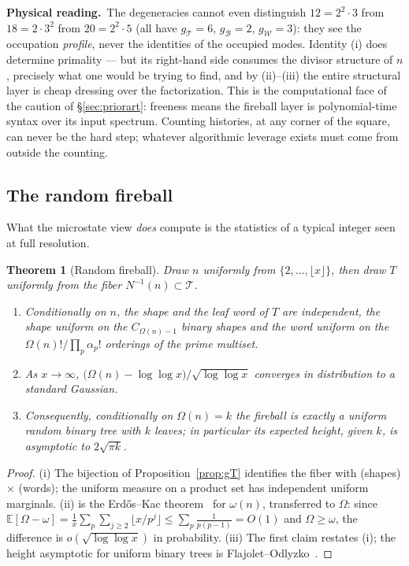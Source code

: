 \documentclass[11pt]{article}
\newcommand{\cT}{\mathcal{T}}   %
\newcommand{\cW}{\mathcal{W}}   %
\newcommand{\cB}{\mathcal{B}}   %
\newcommand{\physread}{\medskip\noindent\textbf{Physical reading.}\ }
\numberwithin{equation}{section}
\theoremstyle{plain}
\newtheorem{theorem}{Theorem}[section]
\theoremstyle{definition}
\theoremstyle{remark}
\begin{document}
\physread The degeneracies cannot even distinguish $12 = 2^2\cdot3$ from
$18 = 2\cdot3^2$ from $20 = 2^2\cdot 5$ (all have $g_\cT = 6$, $g_\cB = 2$,
$g_\cW = 3$): they see the occupation \emph{profile}, never the identities of the
occupied modes. Identity (i) does determine primality --- but its right-hand side
consumes the divisor structure of $n$, precisely what one would be trying to find,
and by (ii)--(iii) the entire structural layer is cheap dressing over the
factorization. This is the computational face of the caution of \S\ref{sec:priorart}:
freeness means the fireball layer is polynomial-time syntax over its input spectrum.
Counting histories, at any corner of the square, can never be the hard step; whatever
algorithmic leverage exists must come from outside the counting.

\subsection{The random fireball}\label{sec:randomfireball}

What the microstate view \emph{does} compute is the statistics of a typical integer
seen at full resolution.

\begin{theorem}[Random fireball]\label{thm:randomfireball}
Draw $n$ uniformly from $\{2, \dots, \lfloor x\rfloor\}$, then draw $T$ uniformly
from the fiber $N^{-1}(n) \subset \cT$.
\begin{enumerate}
\item[(i)] Conditionally on $n$, the shape and the leaf word of $T$ are independent,
the shape uniform on the $C_{\Omega(n)-1}$ binary shapes and the word uniform on the
$\Omega(n)!/\prod_p \alpha_p!$ orderings of the prime multiset.
\item[(ii)] As $x \to \infty$,
$\bigl(\Omega(n) - \log\log x\bigr)/\sqrt{\log\log x}$ converges in distribution to a
standard Gaussian.
\item[(iii)] Consequently, conditionally on $\Omega(n) = k$ the fireball is exactly a
uniform random binary tree with $k$ leaves; in particular its expected height, given
$k$, is asymptotic to $2\sqrt{\pi k}$.
\end{enumerate}
\end{theorem}

\begin{proof}
(i) The bijection of Proposition~\ref{prop:gT} identifies the fiber with
(shapes) $\times$ (words); the uniform measure on a product set has independent
uniform marginals. (ii) is the Erd\H{o}s--Kac theorem~\cite{erdoskac} for
$\omega(n)$, transferred to $\Omega$: since
$\mathbb{E}[\Omega - \omega] = \frac1x\sum_p \sum_{j \ge 2} \lfloor x/p^j \rfloor
\le \sum_p \frac{1}{p(p-1)} = O(1)$ and $\Omega \ge \omega$, the difference is
$o(\sqrt{\log\log x})$ in probability. (iii) The first claim restates (i); the height
asymptotic for uniform binary trees is Flajolet--Odlyzko~\cite{flajoletodlyzko}.
\end{proof}
\end{document}
